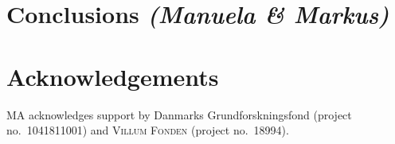 \documentclass{PoS}
\begin{document}
\section{Conclusions {\it (Manuela \& Markus)}}


\section*{Acknowledgements}
MA acknowledges support by Danmarks Grundforskningsfond (project no.~1041811001) and \textsc{Villum Fonden} (project no.~18994).



\end{document}
